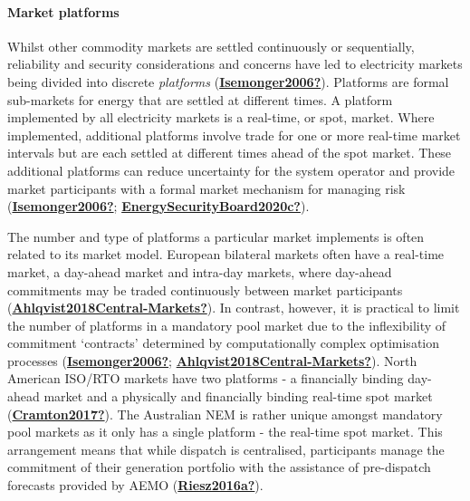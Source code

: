 \documentclass[12pt,a4paper,]{report}
\begin{document}
\hypertarget{market-platforms}{%
\paragraph{Market platforms}\label{market-platforms}}

Whilst other commodity markets are settled continuously or sequentially,
reliability and security considerations and concerns have led to
electricity markets being divided into discrete \emph{platforms}
(\protect\hyperlink{ref-Isemonger2006}{\textbf{Isemonger2006?}}).
Platforms are formal sub-markets for energy that are settled at
different times. A platform implemented by all electricity markets is a
real-time, or spot, market. Where implemented, additional platforms
involve trade for one or more real-time market intervals but are each
settled at different times ahead of the spot market. These additional
platforms can reduce uncertainty for the system operator and provide
market participants with a formal market mechanism for managing risk
(\protect\hyperlink{ref-Isemonger2006}{\textbf{Isemonger2006?}};
\protect\hyperlink{ref-EnergySecurityBoard2020c}{\textbf{EnergySecurityBoard2020c?}}).

The number and type of platforms a particular market implements is often
related to its market model. European bilateral markets often have a
real-time market, a day-ahead market and intra-day markets, where
day-ahead commitments may be traded continuously between market
participants
(\protect\hyperlink{ref-Ahlqvist2018Central-Markets}{\textbf{Ahlqvist2018Central-Markets?}}).
In contrast, however, it is practical to limit the number of platforms
in a mandatory pool market due to the inflexibility of commitment
`contracts' determined by computationally complex optimisation processes
(\protect\hyperlink{ref-Isemonger2006}{\textbf{Isemonger2006?}};
\protect\hyperlink{ref-Ahlqvist2018Central-Markets}{\textbf{Ahlqvist2018Central-Markets?}}).
North American ISO/RTO markets have two platforms - a financially
binding day-ahead market and a physically and financially binding
real-time spot market
(\protect\hyperlink{ref-Cramton2017}{\textbf{Cramton2017?}}). The
Australian NEM is rather unique amongst mandatory pool markets as it
only has a single platform - the real-time spot market. This arrangement
means that while dispatch is centralised, participants manage the
commitment of their generation portfolio with the assistance of
pre-dispatch forecasts provided by AEMO
(\protect\hyperlink{ref-Riesz2016a}{\textbf{Riesz2016a?}}).
\end{document}

